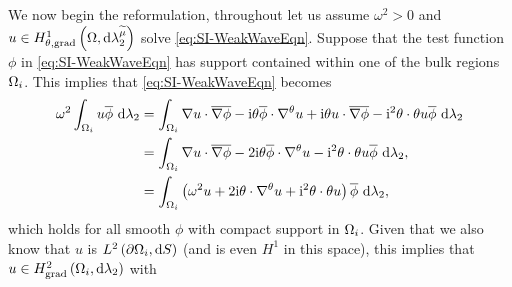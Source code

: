 We now begin the reformulation, throughout let us assume $\omega^2>0$ and $u\in H^1_{\theta, \mathrm{grad}}\left( \Omega, \mathrm{d}\lambda_2^{\widetilde{\mu}} \right)$ solve \eqref{eq:SI-WeakWaveEqn}.
Suppose that the test function $\phi$ in \eqref{eq:SI-WeakWaveEqn} has support contained within one of the bulk regions $\Omega_i$.
This implies that \eqref{eq:SI-WeakWaveEqn} becomes
\begin{align*}
	\omega^2\int_{\Omega_i}u\overline{\phi} \ \mathrm{d}\lambda_2 
	&= \int_{\Omega_i} \nabla u\cdot\overline{\nabla\phi} - \mathrm{i}\theta\overline{\phi}\cdot\nabla^{\theta} u + \mathrm{i}\theta  u\cdot\overline{\nabla\phi} - \mathrm{i}^2\theta\cdot\theta u\overline{\phi}  \ \mathrm{d}\lambda_2 \\
	&= \int_{\Omega_i} \nabla u\cdot\overline{\nabla\phi} - 2\mathrm{i}\theta\overline{\phi}\cdot\nabla^{\theta} u - \mathrm{i}^2\theta\cdot\theta u\overline{\phi}  \ \mathrm{d}\lambda_2, \\ 
	&= \int_{\Omega_i} \left( \omega^2 u + 2\mathrm{i}\theta\cdot\nabla^{\theta} u + \mathrm{i}^2\theta\cdot\theta u \right) \overline{\phi}  \ \mathrm{d}\lambda_2, 
\end{align*}
which holds for all smooth $\phi$ with compact support in $\Omega_i$.
Given that we also know that $u$ is $L^{2}\left( \partial\Omega_i,\mathrm{d} S \right)$ (and is even $H^1$ in this space), this implies that $u\in H^2_\mathrm{grad}\left( \Omega_i, \mathrm{d}\lambda_2 \right)$ with
